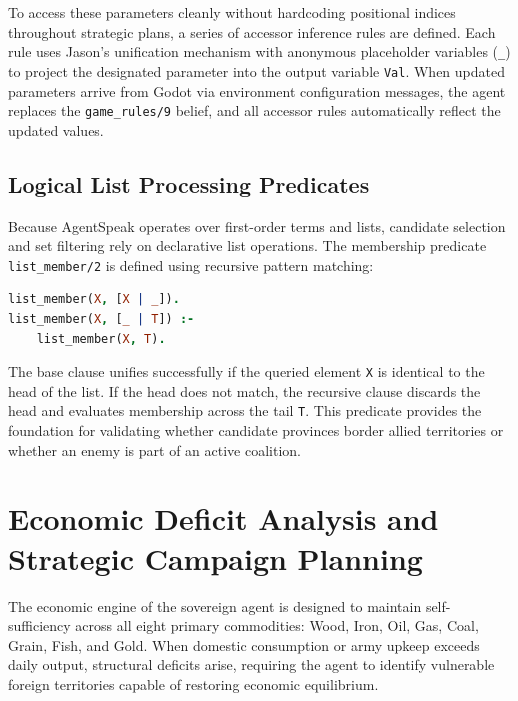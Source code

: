 To access these parameters cleanly without hardcoding positional indices throughout strategic plans, a series of accessor inference rules are defined. Each rule uses Jason's unification mechanism with anonymous placeholder variables (\texttt{\_}) to project the designated parameter into the output variable \texttt{Val}. When updated parameters arrive from Godot via environment configuration messages, the agent replaces the \texttt{game\_rules/9} belief, and all accessor rules automatically reflect the updated values.

\subsection{Logical List Processing Predicates}
\label{sec:impl_list_utils}

Because AgentSpeak operates over first-order terms and lists, candidate selection and set filtering rely on declarative list operations. The membership predicate \texttt{list\_member/2} is defined using recursive pattern matching:

\begin{lstlisting}[language=prolog, caption={List membership inference rule in \texttt{vesna.asl}.}, label={lst:list_utils_asl}]
list_member(X, [X | _]).
list_member(X, [_ | T]) :-
    list_member(X, T).
\end{lstlisting}

The base clause unifies successfully if the queried element \texttt{X} is identical to the head of the list. If the head does not match, the recursive clause discards the head and evaluates membership across the tail \texttt{T}. This predicate provides the foundation for validating whether candidate provinces border allied territories or whether an enemy is part of an active coalition.

\section{Economic Deficit Analysis and Strategic Campaign Planning}
\label{sec:impl_economic_campaign}

The economic engine of the sovereign agent is designed to maintain self-sufficiency across all eight primary commodities: Wood, Iron, Oil, Gas, Coal, Grain, Fish, and Gold. When domestic consumption or army upkeep exceeds daily output, structural deficits arise, requiring the agent to identify vulnerable foreign territories capable of restoring economic equilibrium.

